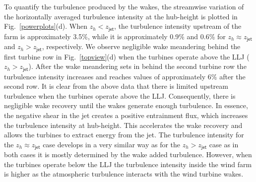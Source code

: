 \documentclass[%
 aip,
 amsmath,amssymb,
preprint,%
author-numerical,%
]{revtex4-1}
\begin{document}
To quantify the turbulence produced by the wakes, the streamwise variation of the horizontally averaged turbulence intensity at the hub-height is plotted in Fig.\ \ref{powerplots}(d). When $z_h < z_\mathsf{jet}$, the turbulence intensity upstream of the farm is approximately 3.5\%, while it is approximately 0.9\% and 0.6\% for $z_h \approx {z_\mathsf{jet}}$ and $z_h > z_\mathsf{jet}$, respectively. We observe negligible wake meandering behind the first turbine row in Fig.\ \ref{topview}(d) when the turbines operate above the LLJ ($z_h > {z_\mathsf{jet}}$). After the wake meandering sets in behind the second turbine row the turbulence intensity increases and reaches values of approximately $6\%$ after the second row. It is clear from the above data that there is limited upstream turbulence when the turbines operate above the LLJ. Consequently, there is negligible wake recovery until the wakes generate enough turbulence. In essence, the negative shear in the jet creates a positive entrainment flux, which increases the turbulence intensity at hub-height. This accelerates the wake recovery and allows the turbines to extract energy from the jet. The turbulence intensity for the $z_h \approx {z_\mathsf{jet}}$ case develops in a very similar way as for the $z_h > {z_\mathsf{jet}}$ case as in both cases it is mostly determined by the wake added turbulence. However, when the turbines operate below the LLJ the turbulence intensity inside the wind farm is higher as the atmospheric turbulence interacts with the wind turbine wakes.

\end{document}
